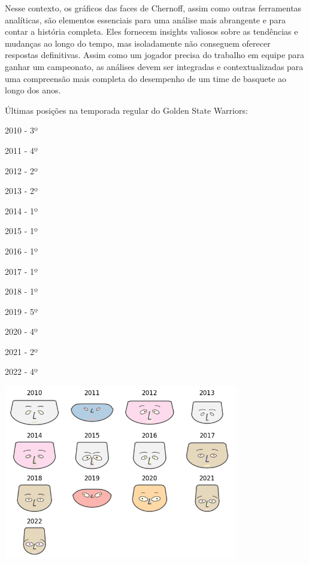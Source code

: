 \documentclass[
]{book}
\begin{document}
Nesse contexto, os gráficos das faces de Chernoff, assim como outras ferramentas analíticas, são elementos essenciais para uma análise mais abrangente e para contar a história completa. Eles fornecem insights valiosos sobre as tendências e mudanças ao longo do tempo, mas isoladamente não conseguem oferecer respostas definitivas. Assim como um jogador precisa do trabalho em equipe para ganhar um campeonato, as análises devem ser integradas e contextualizadas para uma compreensão mais completa do desempenho de um time de basquete ao longo dos anos.

Últimas posições na temporada regular do Golden State Warriors:

2010 - 3º

2011 - 4º

2012 - 2º

2013 - 2º

2014 - 1º

2015 - 1º

2016 - 1º

2017 - 1º

2018 - 1º

2019 - 5º

2020 - 4º

2021 - 2º

2022 - 4º

\includegraphics[width=4.03125in,height=\textheight]{imagens/23.png}

  
\end{document}

